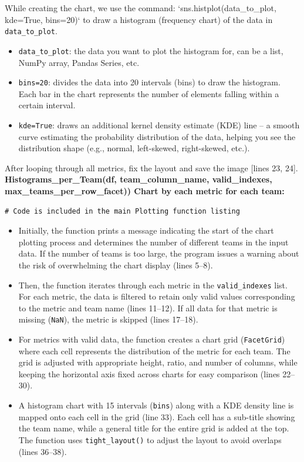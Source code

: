 \documentclass[12pt]{report}
\begin{document}
{{While creating the chart, we use the command:
`sns.histplot(data\_to\_plot, kde=True, bins=20)`
to draw a histogram (frequency chart) of the data in \texttt{data\_to\_plot}.
\begin{itemize}
    \item \texttt{data\_to\_plot}: the data you want to plot the histogram for, can be a list, NumPy array, Pandas Series, etc.
\item \texttt{bins=20}: divides the data into 20 intervals (bins) to draw the histogram. Each bar in the chart represents the number of elements falling within a certain interval.
\item \texttt{kde=True}: draws an additional kernel density estimate (KDE) line – a smooth curve estimating the probability distribution of the data, helping you see the distribution shape (e.g., normal, left-skewed, right-skewed, etc.).
\end{itemize}
After looping through all metrics, fix the layout and save the image [lines 23, 24].
\textbf* { Histograms\_per\_Team(df, team\_column\_name, valid\_indexes, max\_teams\_per\_row\_facet)) Chart by each metric for each team: } %
\begin{lstlisting}
# Code is included in the main Plotting function listing
\end{lstlisting}
\begin{itemize}
\item Initially, the function prints a message indicating the start of the chart plotting process and determines the number of different teams in the input data. If the number of teams is too large, the program issues a warning about the risk of overwhelming the chart display (lines 5–8).
\item Then, the function iterates through each metric in the \texttt{valid\_indexes} list. For each metric, the data is filtered to retain only valid values corresponding to the metric and team name (lines 11–12). If all data for that metric is missing (\texttt{NaN}), the metric is skipped (lines 17–18).
\item For metrics with valid data, the function creates a chart grid (\texttt{FacetGrid}) where each cell represents the distribution of the metric for each team. The grid is adjusted with appropriate height, ratio, and number of columns, while keeping the horizontal axis fixed across charts for easy comparison (lines 22–30).
\item A histogram chart with 15 intervals (\texttt{bins}) along with a KDE density line is mapped onto each cell in the grid (line 33). Each cell has a sub-title showing the team name, while a general title for the entire grid is added at the top. The function uses \texttt{tight\_layout()} to adjust the layout to avoid overlaps (lines 36–38).

\end{itemize}}}
\end{document}
